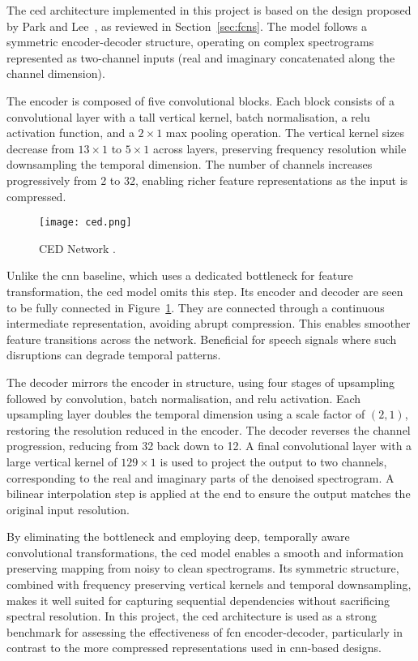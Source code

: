The \gls{ced} architecture implemented in this project is based on the design proposed by Park and Lee~\cite{park2017acoustic}, as reviewed in Section~\ref{sec:fcns}. The model follows a symmetric encoder-decoder structure, operating on complex spectrograms represented as two-channel inputs (real and imaginary concatenated along the channel dimension).

The encoder is composed of five convolutional blocks. Each block consists of a convolutional layer with a tall vertical kernel, batch normalisation, a \gls{relu} activation function, and a \(2 \times 1\) max pooling operation. The vertical kernel sizes decrease from \(13 \times 1\) to \(5 \times 1\) across layers, preserving frequency resolution while downsampling the temporal dimension. The number of channels increases progressively from 2 to 32, enabling richer feature representations as the input is compressed.

\begin{figure}[h]
    \centering
    \texttt{[image: ced.png]}
    \caption{\label{fig:ced}CED Network \cite{park2017acoustic}.}
\end{figure}

Unlike the \gls{cnn} baseline, which uses a dedicated bottleneck for feature transformation, the \gls{ced} model omits this step. Its encoder and decoder are seen to be fully connected in Figure~\ref{fig:ced}. They are connected through a continuous intermediate representation, avoiding abrupt compression. This enables smoother feature transitions across the network. Beneficial for speech signals where such disruptions can degrade temporal patterns.

The decoder mirrors the encoder in structure, using four stages of upsampling followed by convolution, batch normalisation, and \gls{relu} activation. Each upsampling layer doubles the temporal dimension using a scale factor of \((2, 1)\), restoring the resolution reduced in the encoder. The decoder reverses the channel progression, reducing from 32 back down to 12. A final convolutional layer with a large vertical kernel of \(129 \times 1\) is used to project the output to two channels, corresponding to the real and imaginary parts of the denoised spectrogram. A bilinear interpolation step is applied at the end to ensure the output matches the original input resolution.

By eliminating the bottleneck and employing deep, temporally aware convolutional transformations, the \gls{ced} model enables a smooth and information preserving mapping from noisy to clean spectrograms. Its symmetric structure, combined with frequency preserving vertical kernels and temporal downsampling, makes it well suited for capturing sequential dependencies without sacrificing spectral resolution. In this project, the \gls{ced} architecture is used as a strong benchmark for assessing the effectiveness of \gls{fcn} encoder-decoder, particularly in contrast to the more compressed representations used in \gls{cnn}-based designs.


